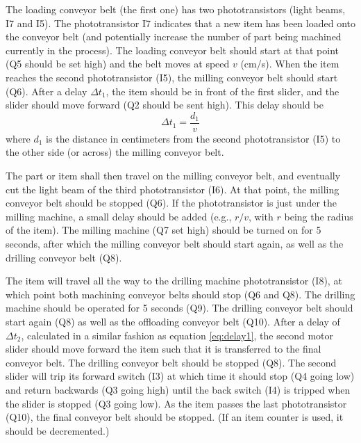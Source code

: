 The loading conveyor belt (the first one) has two phototransistors (light beams, I7 and I5).
The phototransistor I7 indicates that a new item has been loaded onto the conveyor belt (and potentially increase the number of part being machined currently in the process).
The loading conveyor belt should start at that point (Q5 should be set high) and the belt moves at speed $v$ (cm/s).
When the item reaches the second phototransistor (I5), the milling conveyor belt should start (Q6).
After a delay $\Delta t_1$, the item should be in front of the first slider, and the slider should move forward (Q2 should be sent high).
This delay should be
\begin{equation} \label{eq:delay1}
 \Delta t_1 = \frac{d_1}{v}
\end{equation}
where $d_1$ is the distance in centimeters from the second phototransistor (I5) to the other side (or across) the milling conveyor belt.

The part or item shall then travel on the milling conveyor belt, and eventually cut the light beam of the third phototransistor (I6).
At that point, the milling conveyor belt should be stopped (Q6).
If the phototransistor is just under the milling machine, a small delay should be added (e.g., $r/v$, with $r$ being the radius of the item).
The milling machine (Q7 set high) should be turned on for 5 seconds, after which the milling conveyor belt should start again, as well as the drilling conveyor belt (Q8).

The item will travel all the way to the drilling machine phototransistor (I8), at which point both machining conveyor belts should stop (Q6 and Q8).
The drilling machine should be operated for 5 seconds (Q9).
The drilling conveyor belt should start again (Q8) as well as the offloading conveyor belt (Q10).
After a delay of $\Delta t_2$, calculated in a similar fashion as equation \ref{eq:delay1}, the second motor slider should move forward the item such that it is transferred to the final conveyor belt.
The drilling conveyor belt should be stopped (Q8).
The second slider will trip its forward switch (I3) at which time it should stop (Q4 going low) and return backwards (Q3 going high) until the back switch (I4) is tripped when the slider is stopped (Q3 going low).
As the item passes the last phototransistor (Q10), the final conveyor belt should be stopped. (If an item counter is used, it should be decremented.)
